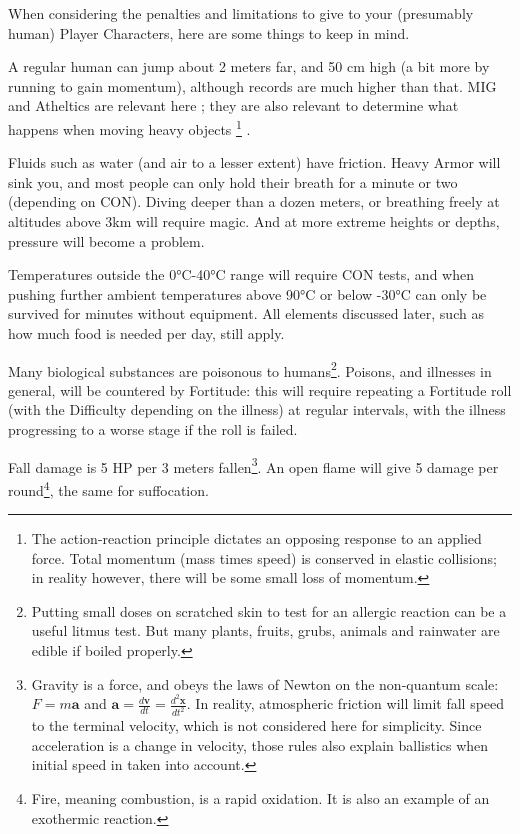 When considering the penalties and limitations to give to your (presumably human) Player Characters, here are some things to keep in mind.

A regular human can jump about 2 meters far, and 50 cm high (a bit more by running to gain momentum), although records are much higher than that. MIG and Atheltics are relevant here ; they are also relevant to determine what happens when moving heavy objects
\footnote{The action-reaction principle dictates an opposing response to an applied force. Total momentum (mass times speed) is conserved in elastic collisions; in reality however, there will be some small loss of momentum.}
.

Fluids such as water (and air to a lesser extent) have friction. Heavy Armor will sink you, and most people can only hold their breath for a minute or two (depending on CON). Diving deeper than a dozen meters, or breathing freely at altitudes above 3km will require magic. And at more extreme heights or depths, pressure will become a problem.

Temperatures outside the 0°C-40°C range will require CON tests, and when pushing further ambient temperatures above 90°C or below -30°C can only be survived for minutes without equipment. All elements discussed later, such as how much food is needed per day, still apply.

Many biological substances are poisonous to humans\footnote{Putting small doses on scratched skin to test for an allergic reaction can be a useful litmus test. But many plants, fruits, grubs, animals and rainwater are edible if boiled properly.}. Poisons, and illnesses in general, will be countered by Fortitude: this will require repeating a Fortitude roll (with the Difficulty depending on the illness) at regular intervals, with the illness progressing to a worse stage if the roll is failed.

Fall damage is 5 HP per 3 meters fallen\footnote{Gravity is a force, and obeys the laws of Newton on the non-quantum scale: $F=m\bm{a}$ and $\bm{a} = \frac{d\bm{v}}{dt}=\frac{d^2 \bm{x}}{dt^2}$. In reality, atmospheric friction will limit fall speed to the terminal velocity, which is not considered here for simplicity. Since acceleration is a change in velocity, those rules also explain ballistics when initial speed in taken into account.}. An open flame will give 5 damage per round\footnote{Fire, meaning combustion, is a rapid oxidation. It is also an example of an exothermic reaction.}, the same for suffocation.


